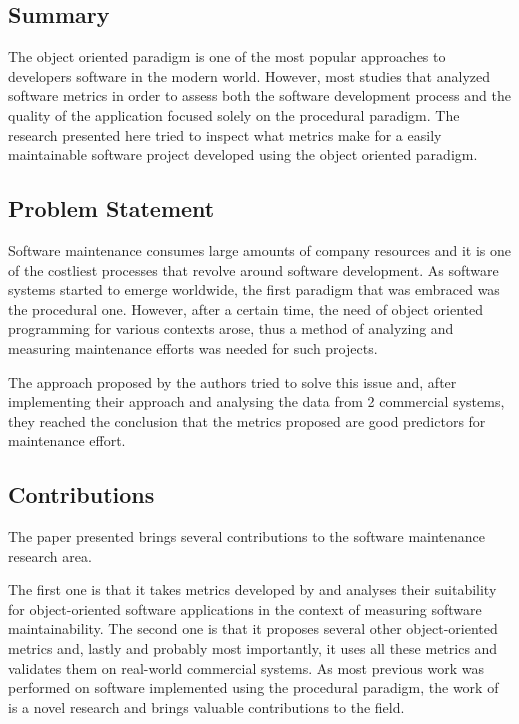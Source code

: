 \documentclass[a4paper,portrait,12pt]{article}
\begin{document}
\subsection{Summary}

The object oriented paradigm is one of the most popular approaches to developers
software in the modern world. However, most studies that analyzed software 
metrics in order to assess both the software development process and the
quality of the application focused solely on the procedural paradigm. 
The research presented here tried to inspect what metrics make for a easily
maintainable software project developed using the object oriented paradigm.

\subsection{Problem Statement}

Software maintenance consumes large amounts of company resources and it is
one of the costliest processes that revolve around software development.
As software systems started to emerge worldwide, the first paradigm that
was embraced was the procedural one. However, after a certain time, the need
of object oriented programming for various contexts arose, thus a method of
analyzing and measuring maintenance efforts was needed for such projects.

The approach proposed by the authors tried to solve this issue and, after 
implementing their approach and analysing the data from 2 commercial systems,
they reached the conclusion that the metrics proposed are good predictors
for maintenance effort.

\subsection{Contributions}

The paper presented brings several contributions to the software maintenance
research area. 

The first one is that it takes metrics developed by \citet{chidamber1994metrics} 
and analyses their suitability for object-oriented software applications in the 
context of measuring software maintainability. The second one is that it proposes 
several other object-oriented metrics and, lastly and probably most importantly, it 
uses all these metrics and validates them on real-world commercial systems. 
As most previous work was performed on software implemented using
the procedural paradigm, the work of \citet{li1993maintenance} is a novel research
and brings valuable contributions to the field.
\end{document}
